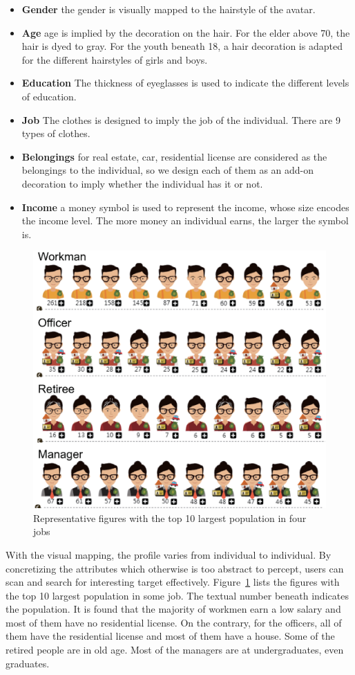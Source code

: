 \begin{itemize}
\item \textbf{Gender} the gender is visually mapped to the hairstyle of the avatar.
\item \textbf{Age} age is implied by the decoration on the hair. For the elder above 70, the hair is dyed to gray. For the youth beneath 18, a hair decoration is adapted for the different hairstyles of girls and boys.
\item \textbf{Education} The thickness of eyeglasses is used to indicate the different levels of education.
\item \textbf{Job} The clothes is designed to imply the job of the individual. There are 9 types of clothes.
\item \textbf{Belongings} for real estate, car, residential license are considered as the belongings to the individual, so we design each of them as an add-on decoration to imply whether the individual has it or not.
\item \textbf{Income} a money symbol is used to represent the income, whose size encodes the income level. The more money an individual earns, the larger the symbol is.
\end{itemize}

\begin{figure}[htb!]
 \centering %
 \includegraphics[width=0.6\columnwidth]{pictures/design_example}
 \caption{Representative figures with the top 10 largest population in four jobs}
 \label{fig:div_example}
\end{figure}

With the visual mapping, the profile varies from individual to individual. By concretizing the attributes which otherwise is too abstract to percept, users can scan and search for interesting target effectively. Figure~\ref{fig:div_example} lists the figures with the top 10 largest population in some job. The textual number beneath indicates the population. It is found that the majority of workmen earn a low salary and most of them have no residential license. On the contrary, for the officers, all of them have the residential license and most of them have a house. Some of the retired people are in old age. Most of the managers are at undergraduates, even graduates.


